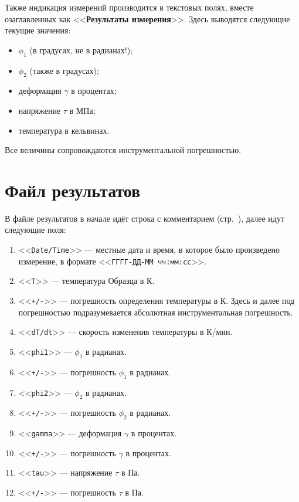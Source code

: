 \documentclass[12pt, a4paper, twocolumn]{report}
\newcommand{\CTL}[1]{<<{\bf #1}>>}
\newcommand{\CMD}[1]{<<{\tt #1}>>}
\begin{document}
Также индикация измерений производится в текстовых полях, вместе озаглавленных как \CTL{Результаты измерения}. Здесь выводятся следующие текущие значения:

\begin{itemize}
\item $\phi_1$ (в градусах, не в радианах!);
\item $\phi_2$ (также в градусах);
\item деформация $\gamma$ в процентах;
\item напряжение $\tau$ в МПа;
\item температура в кельвинах.
\end{itemize}

Все величины сопровождаются инструментальной погрешностью.

\section{Файл результатов}

В файле результатов в начале идёт строка с комментарием (стр.~\pageref{sec_dut_comment}), далее идут следующие поля:

\begin{enumerate}
\item \CMD{Date/Time} --- местные дата и время, в которое было произведено измерение, в формате \mbox{\CMD{ГГГГ-ДД-ММ чч:мм:сс}}.
\item \CMD{T} --- температура Образца в К.
\item \CMD{+/-} --- погрешность определения температуры в К. Здесь и далее под погрешностью подразумевается абсолютная инструментальная погрешность.
\item \CMD{dT/dt} --- скорость изменения температуры в К/мин.
\item \CMD{phi1} --- $\phi_1$ в радианах.
\item \CMD{+/-} --- погрешность $\phi_1$ в радианах.
\item \CMD{phi2} --- $\phi_2$ в радианах.
\item \CMD{+/-} --- погрешность $\phi_2$ в радианах.
\item \CMD{gamma} --- деформация $\gamma$ в процентах.
\item \CMD{+/-} --- погрешность $\gamma$ в процентах.
\item \CMD{tau} --- напряжение $\tau$ в Па.
\item \CMD{+/-} --- погрешность $\tau$ в Па.
\end{enumerate}
\end{document}
